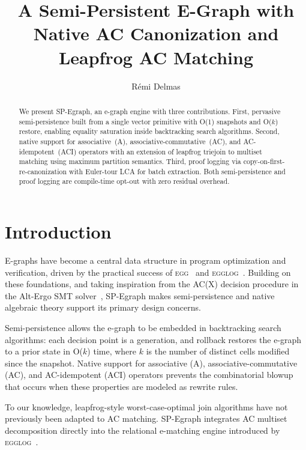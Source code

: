 \documentclass[sigplan,nonacm]{acmart}
\begin{document}
\title{A Semi-Persistent E-Graph with Native AC Canonization and Leapfrog AC Matching}

\author{R\'{e}mi Delmas}

\begin{abstract}\sloppy
We present SP-Egraph, an e-graph engine with three contributions.
First, pervasive semi-persistence built from a single vector
primitive with O(1) snapshots and O($k$) restore, enabling
equality saturation inside backtracking search algorithms.
Second, native support for associative~(A),
associative-commutative~(AC), and AC-idempotent~(ACI) operators
with an extension of leapfrog triejoin to multiset matching
using maximum partition semantics.
Third, proof logging via copy-on-first-re-canonization with
Euler-tour LCA for batch extraction.
Both semi-persistence and proof logging are compile-time opt-out
with zero residual overhead.
\end{abstract}

\maketitle

\section{Introduction}

E-graphs have become a central data structure in program optimization
and verification, driven by the practical success of
\textsc{egg}~\cite{egg} and \textsc{egglog}~\cite{egglog}.
Building on these foundations, and taking inspiration from the
AC(X) decision procedure in the Alt-Ergo SMT
solver~\cite{iguernlala}, SP-Egraph makes semi-persistence and
native algebraic theory support its primary design concerns.

Semi-persistence allows the e-graph to be embedded in backtracking
search algorithms: each decision point is a generation, and
rollback restores the e-graph to a prior state in O($k$) time,
where $k$ is the number of distinct cells modified since the
snapshot.  Native support for associative (A),
associative-commutative (AC), and AC-idempotent (ACI) operators
prevents the combinatorial blowup that occurs when these properties
are modeled as rewrite rules.

To our knowledge, leapfrog-style worst-case-optimal join algorithms
have not previously been adapted to AC matching.  SP-Egraph
integrates AC multiset decomposition directly into the relational
e-matching engine introduced by \textsc{egglog}~\cite{egglog,veldhuizen}.
\end{document}

